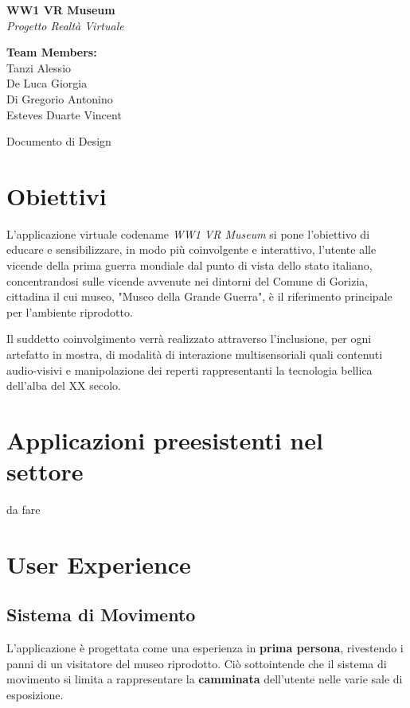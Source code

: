 \documentclass[10pt, openany]{article}
\begin{document}
  \begin{titlepage}
    \begin{center}
      {\Huge\textbf{WW1 VR Museum}} \\[1cm]
      {\Large\textit{Progetto Realt\`a Virtuale}} \\[2cm]
      \vfill
    \end{center}
    \hfill
    \begin{minipage}[t]{0.4\textwidth}
      \raggedleft
      \textbf{Team Members:} \\
      Tanzi	Alessio \\
      De Luca Giorgia \\
      Di Gregorio	Antonino \\
      Esteves Duarte Vincent \\
    \end{minipage}
    \vfill
    \begin{center}
      {\large Documento di Design}
    \end{center}
  \end{titlepage}
  \tableofcontents
  \section{Obiettivi}
    L'applicazione virtuale codename \textit{WW1 VR Museum} si pone l'obiettivo di educare e sensibilizzare, in modo
    pi\`u coinvolgente e interattivo, l'utente alle vicende della prima guerra mondiale dal punto di vista dello stato italiano, 
    concentrandosi sulle vicende avvenute nei dintorni del Comune di Gorizia, cittadina il cui museo, "Museo della Grande Guerra", \`e 
    il riferimento principale per l'ambiente riprodotto.\par
    Il suddetto coinvolgimento verr\`a realizzato attraverso l'inclusione, per ogni artefatto in mostra, di modalit\`a di interazione
    multisensoriali quali contenuti audio-visivi e manipolazione dei reperti rappresentanti la tecnologia bellica dell'alba del XX secolo.
  \section{Applicazioni preesistenti nel settore}
    da fare
  \section{User Experience}\label{vr:ux}
    \subsection{Sistema di Movimento}
    L'applicazione \`e progettata come una esperienza in \textbf{prima persona}, rivestendo i panni di un visitatore del museo riprodotto.
    Ci\`o sottointende che il sistema di movimento si limita a rappresentare la \textbf{camminata} dell'utente nelle varie sale di esposizione.\par
\end{document}
